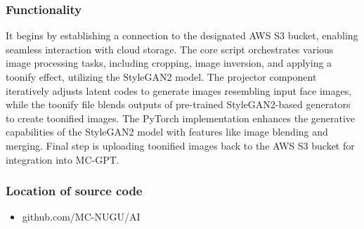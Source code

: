 \documentclass[conference]{IEEEtran}
\begin{document}
        \subsubsection{Functionality}
            It begins by establishing a connection to the designated AWS S3 bucket, enabling seamless interaction with cloud storage. The core script orchestrates various image processing tasks, including cropping, image inversion, and applying a toonify effect, utilizing the StyleGAN2 model. The projector component iteratively adjusts latent codes to generate images resembling input face images, while the toonify file blends outputs of pre-trained StyleGAN2-based generators to create toonified images. The PyTorch implementation enhances the generative capabilities of the StyleGAN2 model with features like image blending and merging. Final step is uploading toonified images back to the AWS S3 bucket for integration into MC-GPT.\\
            \vspace{3mm}
        \subsubsection{Location of source code}
            \begin{itemize}
                \item github.com/MC-NUGU/AI
            \end{itemize}
\end{document}

